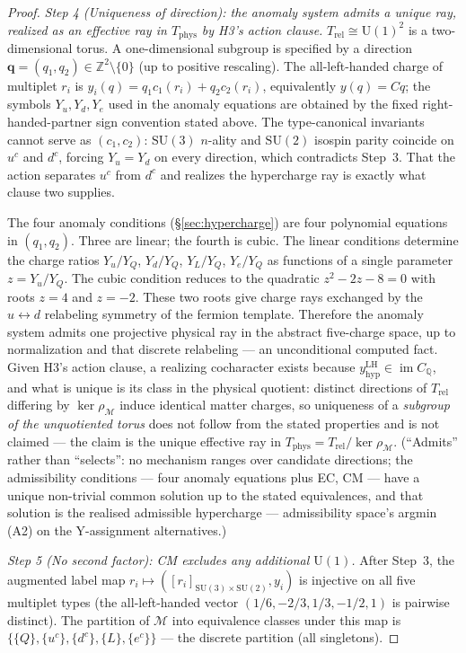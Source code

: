 \documentclass[11pt]{article}
\theoremstyle{definition}
\newcommand{\SU}{\mathrm{SU}}
\newcommand{\U}{\mathrm{U}}
\begin{document}
\begin{proof}
\textit{Step 4 (Uniqueness of direction): the anomaly system admits a
unique ray, realized as an effective ray in $T_{\mathrm{phys}}$ by
H3's action clause.}\quad
$T_{\mathrm{rel}} \cong \mathrm{U}(1)^2$ is a two-dimensional torus.
A one-dimensional subgroup is specified by a direction
$\mathbf{q} = (q_1, q_2) \in \mathbb{Z}^2 \setminus \{0\}$ (up to
positive rescaling).  The all-left-handed charge of multiplet $r_i$ is
$y_i(q)=q_1c_1(r_i)+q_2c_2(r_i)$, equivalently $y(q)=Cq$; the
symbols $Y_u,Y_d,Y_e$ used in the anomaly equations are obtained by
the fixed right-handed-partner sign convention stated above.
The type-canonical invariants cannot serve as $(c_1, c_2)$: $\SU(3)$
$n$-ality and $\SU(2)$ isospin parity coincide on $u^c$ and $d^c$,
forcing $Y_u = Y_d$ on every direction, which contradicts Step~3.
That the action separates $u^c$ from $d^c$ and realizes the
hypercharge ray is exactly what clause two supplies.

The four anomaly conditions (\S\ref{sec:hypercharge}) are four
polynomial equations in $(q_1, q_2)$.  Three are linear; the
fourth is cubic.  The linear conditions determine the charge
ratios $Y_u/Y_Q$, $Y_d/Y_Q$, $Y_L/Y_Q$, $Y_e/Y_Q$
as functions of a single parameter $z = Y_u/Y_Q$.  The cubic
condition reduces to the quadratic $z^2 - 2z - 8 = 0$ with roots
$z = 4$ and $z = -2$.  These two roots give charge rays exchanged by the
$u\leftrightarrow d$ relabeling symmetry of the fermion template.
Therefore the anomaly system admits one projective physical ray in the
abstract five-charge space, up to normalization and that discrete
relabeling --- an unconditional computed fact.  Given H3's action clause, a realizing
cocharacter exists because
$y_{\mathrm{hyp}}^{\mathrm{LH}}\in\operatorname{im}C_{\mathbb Q}$,
and what is unique is its class in the physical quotient: distinct directions of $T_{\mathrm{rel}}$ differing by
$\ker\rho_{\mathcal{M}}$ induce identical matter charges, so
uniqueness of a \emph{subgroup of the unquotiented torus} does not
follow from the stated properties and is not claimed --- the claim is
the unique effective ray in
$T_{\mathrm{phys}} = T_{\mathrm{rel}} / \ker\rho_{\mathcal{M}}$.  (``Admits'' rather than ``selects'': no
mechanism ranges over candidate directions; the admissibility
conditions --- four anomaly equations plus EC, CM --- have a unique
non-trivial common solution up to the stated equivalences, and
that solution is the realised admissible hypercharge --- admissibility
space's argmin (A2) on the Y-assignment alternatives.)

\textit{Step 5 (No second factor): CM excludes any additional
$\U(1)$.}\quad
After Step~3, the augmented label map
$r_i\mapsto([r_i]_{\SU(3)\times\SU(2)},y_i)$ is injective on
all five multiplet types (the all-left-handed vector
$(1/6,-2/3,1/3,-1/2,1)$ is pairwise distinct).  The partition of
$\mathcal{M}$ into equivalence classes under this map is
$\{\{Q\}, \{u^c\}, \{d^c\}, \{L\}, \{e^c\}\}$ --- the discrete
partition (all singletons).


\end{proof}
\end{document}
